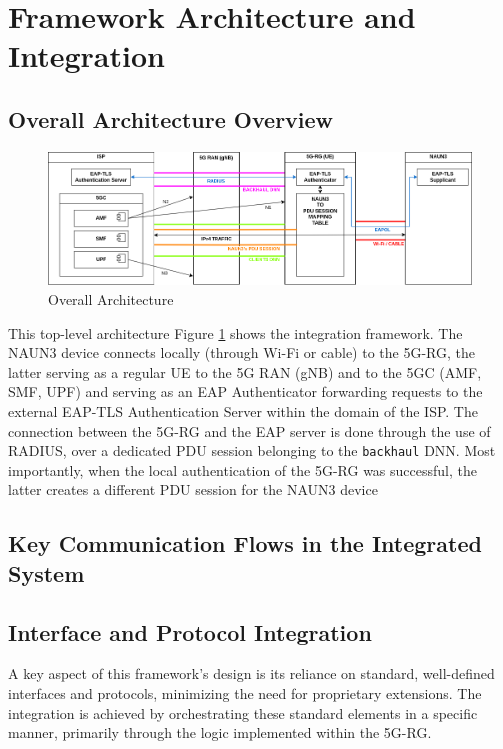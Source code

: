 \section{Framework Architecture and Integration}

\subsection{Overall Architecture Overview}

\begin{figure}
    \centering
    \includegraphics[width=0.75\linewidth]{figs/overall-topology.png}
    \caption{Overall Architecture}
    \label{fig:Overall Architecture}
\end{figure}

This top-level architecture Figure \ref{fig:Overall Architecture} shows the integration framework. The \ac{NAUN3} device connects locally (through Wi-Fi or cable) to the \ac{5G-RG}, the latter serving as a regular \ac{UE} to the \ac{5G} \ac{RAN} (\ac{gNB}) and to the \ac{5GC} (\ac{AMF}, \ac{SMF}, \ac{UPF}) and serving as an \ac{EAP} Authenticator forwarding requests to the external \ac{EAP-TLS} Authentication Server within the domain of the \ac{ISP}. The connection between the \ac{5G-RG} and the \ac{EAP} server is done through the use of \ac{RADIUS}, over a dedicated \ac{PDU} session belonging to the \texttt{backhaul} \ac{DNN}. Most importantly, when the local authentication of the \ac{5G-RG} was successful, the latter creates a different \ac{PDU} session for the \ac{NAUN3} device

\subsection{Key Communication Flows in the Integrated System}

\subsection{Interface and Protocol Integration}

A key aspect of this framework's design is its reliance on standard, well-defined interfaces and protocols, minimizing the need for proprietary extensions. The integration is achieved by orchestrating these standard elements in a specific manner, primarily through the logic implemented within the \ac{5G-RG}.

